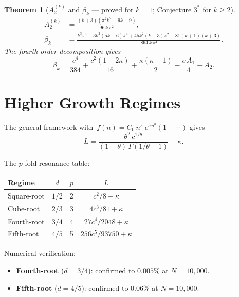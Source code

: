 \documentclass[11pt,a4paper]{article}
\newtheorem{theorem}{Theorem}[section]
\begin{document}
\begin{theorem}[$A_2^{(k)}$ and $\beta_k$ --- proved for $k=1$; Conjecture $3^*$ for $k \geq 2$]\label{thm:A2k}
\begin{align}
  A_2^{(k)} &= \frac{(k+3)(\pi^2 k^2 - 9k - 9)}{96\,k\,\pi^2}, \label{eq:A2k}\\[4pt]
  \beta_k &= \frac{k^3\pi^6 - 3k^2(5k+6)\pi^4 + 45k^2(k+3)\pi^2 + 81(k+1)(k+3)}{864\,k\,\pi^2}. \label{eq:betak}
\end{align}
The fourth-order decomposition gives
\begin{equation}\label{eq:beta_decomp}
  \beta_k = \frac{c^4}{384} + \frac{c^2(1+2\kappa)}{16} + \frac{\kappa(\kappa+1)}{2} - \frac{c\,A_1}{4} - A_2.
\end{equation}
\end{theorem}

\section{Higher Growth Regimes}\label{sec:higher_growth}

The general framework with~$f(n) = C_0\,n^{\kappa}\,e^{c\,n^{\theta}}(1 + \cdots)$ gives
\begin{equation}\label{eq:general_L}
  L = \frac{\theta^2\,c^{1/\theta}}{(1+\theta)\,\Gamma(1/\theta + 1)} + \kappa.
\end{equation}

The $p$-fold resonance table:
\begin{center}
\begin{tabular}{@{}lccc@{}}
\toprule
Regime & $d$ & $p$ & $L$ \\
\midrule
Square-root   & $1/2$ & 2 & $c^2/8 + \kappa$ \\
Cube-root     & $2/3$ & 3 & $4c^3/81 + \kappa$ \\
Fourth-root   & $3/4$ & 4 & $27c^4/2048 + \kappa$ \\
Fifth-root    & $4/5$ & 5 & $256c^5/93750 + \kappa$ \\
\bottomrule
\end{tabular}
\end{center}

\noindent Numerical verification:
\begin{itemize}
  \item \textbf{Fourth-root} ($d=3/4$): confirmed to $0.005\%$ at $N=10{,}000$.
  \item \textbf{Fifth-root} ($d=4/5$): confirmed to $0.06\%$ at $N=10{,}000$.
\end{itemize}
\end{document}
